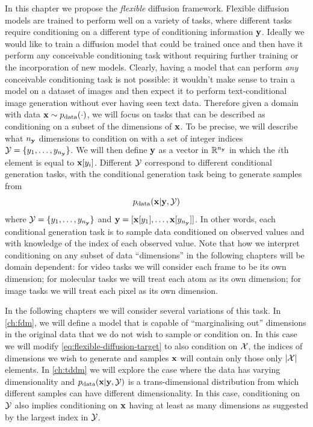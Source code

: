 In this chapter we propose the \textit{flexible} diffusion framework. Flexible diffusion models are trained to perform well on a variety of tasks, where different tasks require conditioning on a different type of conditioning information ${\mathbf{y}}$. Ideally we would like to train a diffusion model that could be trained once and then have it perform any conceivable conditioning task without requiring further training or the incorporation of new models. Clearly, having a model that can perform \textit{any} conceivable conditioning task is not possible: it wouldn't make sense to train a model on a dataset of images and then expect it to perform text-conditional image generation without ever having seen text data. Therefore given a domain with data ${\mathbf{x}} \sim p_{\rm{data}}(\cdot)$, we will focus on tasks that can be described as conditioning on a subset of the dimensions of ${\mathbf{x}}$. 
To be precise, we will describe what $n_{\mathbf{y}}$ dimensions to condition on with a set of integer indices ${\mathcal{Y}} = \{ y_1, \ldots, y_{n_{\mathbf{y}}} \}$. We will then define ${\mathbf{y}}$ as a vector in $\mathbb{R}^{n_{\mathbf{y}}}$ in which the $i$th element is equal to ${\mathbf{x}}[y_i]$. Different ${\mathcal{Y}}$ correspond to different conditional generation tasks, with the conditional generation task being to generate samples from
\begin{equation} \label{eq:flexible-diffusion-target}
    p_{\rm{data}}({\mathbf{x}} | {\mathbf{y}}, {\mathcal{Y}})
\end{equation}
where ${\mathcal{Y}} = \{ y_1, \ldots, y_{n_{\mathbf{y}}} \}$ and ${\mathbf{y}} = [ {\mathbf{x}}[y_1], \ldots, {\mathbf{x}}[y_{n_{\mathbf{y}}}] ]$. In other words, each conditional generation task is to sample data conditioned on observed values and with knowledge of the index of each observed value. Note that how we interpret conditioning on any subset of data ``dimensions'' in the following chapters will be domain dependent: for video tasks we will consider each frame to be its own dimension; for molecular tasks we will treat each atom as its own dimension; for image tasks we will treat each pixel as its own dimension. 

In the following chapters we will consider several variations of this task. In \cref{ch:fdm}, we will define a model that is capable of ``marginalising out'' dimensions in the original data that we do not wish to sample or condition on. In this case we will modify \cref{eq:flexible-diffusion-target} to also condition on ${\mathcal{X}}$, the indices of dimensions we wish to generate and samples ${\mathbf{x}}$ will contain only those only $|{\mathcal{X}}|$ elements. In \cref{ch:tddm} we will explore the case where the data has varying dimensionality and $p_{\rm{data}}({\mathbf{x}} | {\mathbf{y}}, {\mathcal{Y}})$ is a trans-dimensional distribution from which different samples can have different dimensionality. In this case, conditioning on ${\mathcal{Y}}$ also implies conditioning on ${\mathbf{x}}$ having at least as many dimensions as suggested by the largest index in ${\mathcal{Y}}$.


